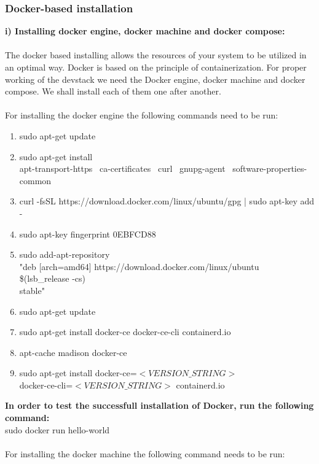 \documentclass[12pt]{article}
\begin{document}
\subsubsection{Docker-based installation}
	\label{sec:dockerinstall}
	\textbf{i) Installing docker engine, docker machine and docker compose:}
	\\ \\
	The docker based installing allows the resources of your system to be utilized in an optimal way. Docker is based on the principle of containerization. For proper working of the devstack we need the Docker engine, docker machine and docker compose. We shall install each of them one after another.\\ \\
	For installing the docker engine the following commands need to be run:
	\begin{enumerate}
		\item sudo apt-get update
		\item sudo apt-get install \ \\
		apt-transport-https \
		ca-certificates \
		curl \
		gnupg-agent \
		software-properties-common
		\item curl -fsSL https://download.docker.com/linux/ubuntu/gpg | sudo apt-key add -
		\item sudo apt-key fingerprint 0EBFCD88
		\item sudo add-apt-repository \ \\
		"deb [arch=amd64] https://download.docker.com/linux/ubuntu \ \\
		\$(lsb\_release -cs) \ \\
		stable"
		\item sudo apt-get update
		\item sudo apt-get install docker-ce docker-ce-cli containerd.io
		\item apt-cache madison docker-ce
		\item sudo apt-get install docker-ce=$<VERSION\_STRING>$\\docker-ce-cli=$<VERSION\_STRING>$ containerd.io
	\end{enumerate}
	\textbf{In order to test the successfull installation of Docker, run the following \\command:\\}
	sudo docker run hello-world\\\\
	For installing the docker machine the following command needs to be run:\\ \\
\end{document}
